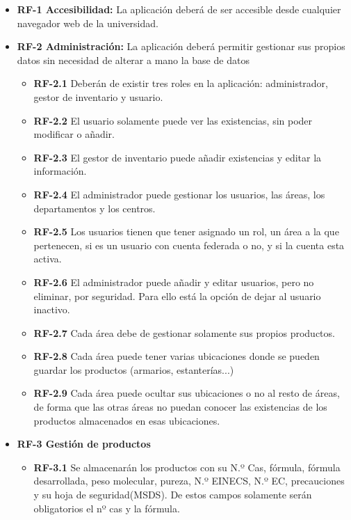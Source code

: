 \begin{itemize}
\item \textbf{RF-1 Accesibilidad:} La aplicación deberá de ser accesible desde cualquier navegador web de la universidad.

\item \textbf{RF-2 Administración:} La aplicación deberá permitir gestionar sus propios datos sin necesidad de alterar a mano la base de datos
	\begin{itemize}
	\item\textbf{ RF-2.1} Deberán de existir tres roles en la aplicación: administrador, gestor de inventario y usuario.
	
	\item \textbf{RF-2.2} El usuario solamente puede ver las existencias, sin poder modificar o añadir.
	
	\item \textbf{RF-2.3} El gestor de inventario puede añadir existencias y editar la información.
	
	\item \textbf{RF-2.4} El administrador puede gestionar los usuarios, las áreas, los departamentos y los centros.
	
	\item \textbf{RF-2.5} Los usuarios tienen que tener asignado un rol, un área a la que pertenecen, si es un usuario con cuenta federada o no, y si la cuenta esta activa.
	
	\item \textbf{RF-2.6} El administrador puede añadir y editar usuarios, pero no eliminar, por seguridad. Para ello está la opción de dejar al usuario inactivo.
	
	\item \textbf{RF-2.7} Cada área debe de gestionar solamente sus propios productos.
	
	\item \textbf{RF-2.8} Cada área puede tener varias ubicaciones donde se pueden guardar los productos (armarios, estanterías...)
	
	\item \textbf{RF-2.9} Cada área puede ocultar sus ubicaciones o no al resto de áreas, de forma que las otras áreas no puedan conocer las existencias de los productos almacenados en esas ubicaciones.
	
	\end{itemize}
	
\item \textbf{RF-3 Gestión de productos}
	\begin{itemize}
	\item\textbf{ RF-3.1} Se almacenarán los productos con su N.º Cas, fórmula, fórmula desarrollada, peso molecular, pureza, N.º EINECS, N.º EC, precauciones y su hoja de seguridad(MSDS). De estos campos solamente serán obligatorios el nº cas y la fórmula.
	

\end{itemize}
\end{itemize}
